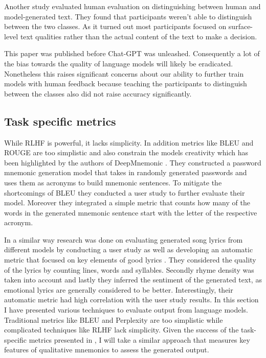Another study \cite{clark2020human} evaluated human evaluation on distinguishing between human and model-generated text. They found that participants weren't able to distinguish between the two classes. As it turned out most participants focused on surface-level text qualities rather than the actual content of the text to make a decision.

This paper was published before Chat-GPT was unleashed. Consequently a lot of the bias towards the quality of language models will likely be eradicated. Nonetheless this raises significant concerns about our ability to further train models with human feedback because teaching the participants to distinguish between the classes also did not raise accuracy significantly.

\subsection{Task specific metrics}
While RLHF is powerful, it lacks simplicity. In addition metrics like BLEU and ROUGE are too simplistic and also constrain the models creativity which has been highlighted by the authors of DeepMnemonic \cite{deepMnemonic2022}. They constructed a password mnemonic generation model that takes in randomly generated passwords and uses them as acronyms to build mnemonic sentences. To mitigate the shortcomings of BLEU they conducted a user study to further evaluate their model. Moreover they integrated a simple metric that counts how many of the words in the generated mnemonic sentence start with the letter of the respective acronym. 

In a similar way research was done on evaluating generated song lyrics from different models by conducting a user study as well as developing an automatic metric that focused on key elements of good lyrics \cite{lyrics_gen_2021}. They considered the quality of the lyrics by counting lines, words and syllables. Secondly rhyme density was taken into account and lastly they inferred the sentiment of the generated text, as emotional lyrics are generally considered to be better. Interestingly, their automatic metric had high correlation with the user study results. 
\newline
\newline
In this section I have presented various techniques to evaluate output from language models. Traditional metrics like BLEU and Perplexity are too simplistic while complicated techniques like RLHF lack simplicity. Given the success of the task-specific metrics presented in \cite{lyrics_gen_2021}, I will take a similar approach that measures key features of qualitative mnemonics to assess the generated output.


